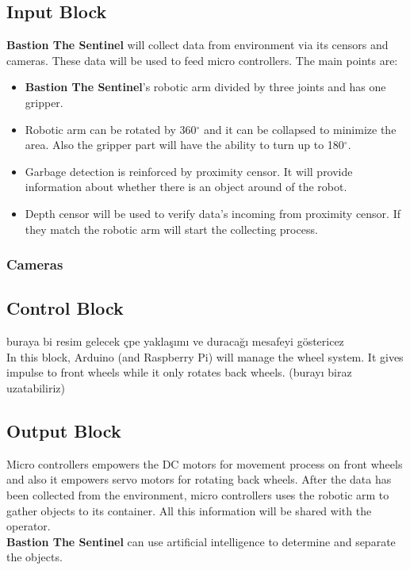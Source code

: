 \documentclass[12pt,a4paper]{article}
\begin{document}
   \subsection{Input Block}
    \begin{flushleft}
     \textbf{Bastion The Sentinel} will collect data from environment via its censors and cameras. These data will be used to 
     feed micro controllers. The main points are:
     \begin{itemize}
      \item \textbf{Bastion The Sentinel}'s robotic arm divided by three joints and has one gripper.
      \item Robotic arm can be rotated by 360$^{\circ}$ and it can be collapsed to minimize the area. Also the gripper part will 
      have the ability to turn up to 180$^{\circ}$.
      \item Garbage detection is reinforced by proximity censor. It will provide information about whether there is an object around 
      of the robot.
      \item Depth censor will be used to verify data's incoming from proximity censor. If they match the robotic arm will start the 
      collecting process.
     \end{itemize}

    \end{flushleft}

    \subsubsection{Cameras}
     \begin{flushleft}
      
     \end{flushleft}
   \subsection{Control Block}
    \begin{flushleft}
     buraya bi resim gelecek çpe yaklaşımı ve duracağı mesafeyi göstericez\\
     In this block, Arduino (and Raspberry Pi) will manage the wheel system. It gives impulse to front wheels while it only 
     rotates back wheels. (burayı biraz uzatabiliriz)
    \end{flushleft}

   \subsection{Output Block}
    \begin{flushleft}
     Micro controllers empowers the DC motors for movement process on front wheels and also it empowers servo motors for 
     rotating back wheels. After the data has been collected from the environment, micro controllers uses the robotic arm 
     to gather objects to its container. All this information will be shared with the operator.\\
     \textbf{Bastion The Sentinel} can use artificial intelligence to determine and separate the objects.
    \end{flushleft}
\end{document}
